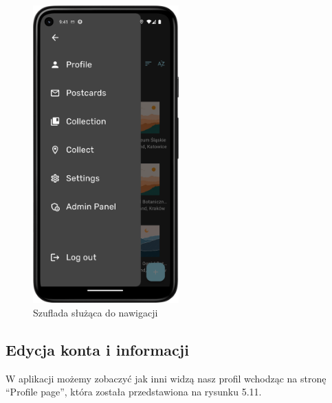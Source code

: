 \documentclass[a4paper,twoside,12pt]{book}
\begin{document}
\begin{figure}[H]
    \centering
    \includegraphics[width=0.5\textwidth]{mobile_ss/szuflada.png}
    \caption{Szuflada służąca do nawigacji}
\end{figure}

\subsection{Edycja konta i informacji}
W aplikacji możemy zobaczyć jak inni widzą nasz profil wchodząc na stronę ``Profile page'', która została przedstawiona na rysunku 5.11.
\end{document}
